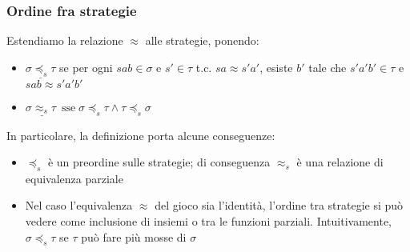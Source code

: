 \documentclass{beamer}
\begin{document}
\begin{frame}
 \frametitle{Ordine fra strategie}
 Estendiamo la relazione $\approx$ alle strategie, ponendo:
 \pause
	\begin{itemize}
	\item $\underline{ \sigma \preccurlyeq_s \tau }$ se per ogni $sab \in \sigma$ e $s' \in \tau$ t.c. $sa\approx s'a'$, esiste $b'$ tale che $s'a'b' \in \tau$ e $sab\approx s'a'b'$
	\item $\underline{ \sigma \approx_s \tau \ } \; \text{sse} \; \sigma \preccurlyeq_s \tau \wedge \tau \preccurlyeq_s \sigma$
	\end{itemize}  
	\pause
In particolare, la definizione porta alcune conseguenze: 

	\begin{itemize}
		\item $\preccurlyeq_s$ è un preordine sulle strategie; di conseguenza $\approx_s$ è una relazione di equivalenza parziale
		\item Nel caso l'equivalenza $\approx$ del gioco sia l'identità, l'ordine tra strategie si può vedere come inclusione di insiemi o tra le funzioni parziali. Intuitivamente, $\sigma \preccurlyeq_s \tau$ se $\tau$ può fare più mosse di $\sigma$
	\end{itemize}
	
\end{frame}
\end{document}
